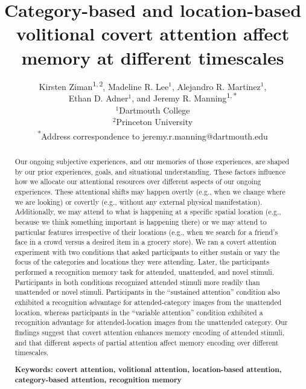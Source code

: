 \documentclass[english]{article}
\begin{document}
\title{Category-based and location-based volitional covert attention affect
memory at different timescales}

\author{Kirsten Ziman\textsuperscript{$1, 2$},
Madeline R. Lee$^1$,
Alejandro R. Martinez$^1$,\\
Ethan D. Adner$^1$,
and
Jeremy R. Manning\textsuperscript{$1, *$}\\[0.1in]$^1$Dartmouth College\\
$^2$Princeton University\\
\textsuperscript{*}Address correspondence to jeremy.r.manning@dartmouth.edu}

\maketitle

\begin{abstract} 
  
Our ongoing subjective experiences, and our memories of those experiences, are
shaped by our prior experiences, goals, and situational understanding. These
factors influence how we allocate our attentional resources over different
aspects of our ongoing experiences. These attentional shifts may happen overtly
(e.g., when we change where we are looking) or covertly (e.g., without any
external physical manifestation). Additionally, we may attend to what is
happening at a specific spatial location (e.g., because we think something
important is happening there) or we may attend to particular features
irrespective of their locations (e.g., when we search for a friend's face in a
crowd versus a desired item in a grocery store). We ran a covert attention
experiment with two conditions that asked participants to either sustain or
vary the focus of the categories and locations they were attending. Later, the
participants performed a recognition memory task for attended, unattended, and
novel stimuli. Participants in both conditions recognized attended stimuli more
readily than unattended or novel stimuli. Participants in the ``sustained
attention'' condition also exhibited a recognition advantage for
attended-category images from the unattended location, whereas participants in
the ``variable attention'' condition exhibited a recognition advantage for
attended-location images from the unattended category. Our findings suggest
that covert attention enhances memory encoding of attended stimuli, and that
different aspects of partial attention affect memory encoding over different
timescales.

\noindent\textbf{Keywords: covert attention, volitional attention,
location-based attention, category-based attention, recognition memory}

\end{abstract}
\end{document}
